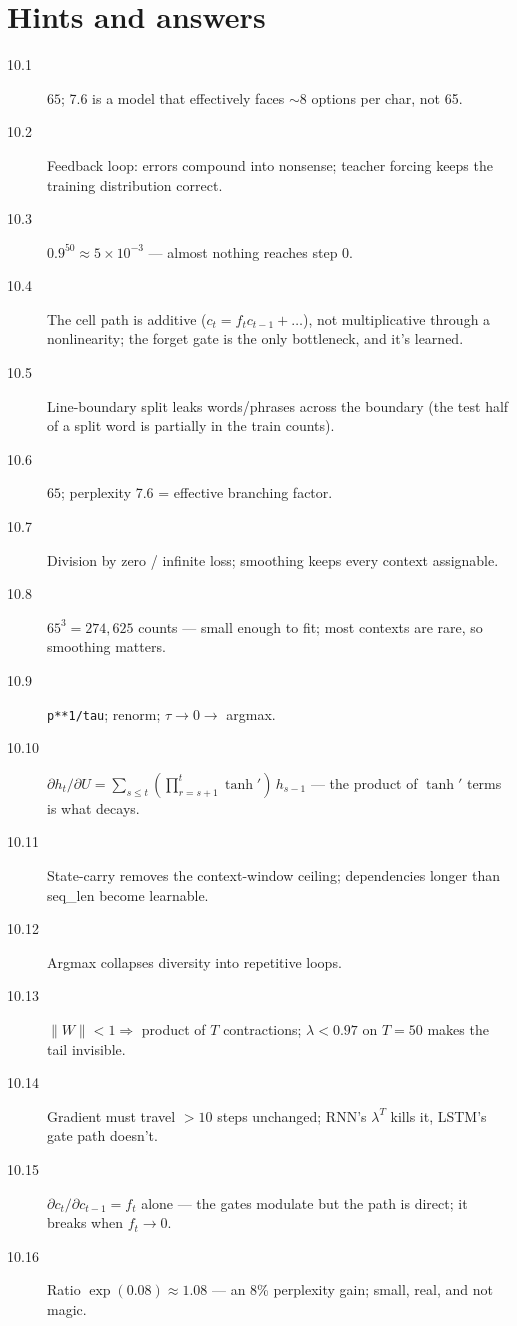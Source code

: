 \section*{Hints and answers}
\begin{description}
\item[10.1] $65$; 7.6 is a model that effectively faces $\sim$8
options per char, not 65.
\item[10.2] Feedback loop: errors compound into nonsense; teacher
forcing keeps the training distribution correct.
\item[10.3] $0.9^{50}\approx5\times10^{-3}$ --- almost nothing
reaches step 0.
\item[10.4] The cell path is additive ($c_t=f_tc_{t-1}+\ldots$), not
multiplicative through a nonlinearity; the forget gate is the only
bottleneck, and it's learned.
\item[10.5] Line-boundary split leaks words/phrases across the
boundary (the test half of a split word is partially in the train
counts).
\item[10.6] $65$; perplexity 7.6 = effective branching factor.
\item[10.7] Division by zero / infinite loss; smoothing keeps every
context assignable.
\item[10.8] $65^3=274{,}625$ counts --- small enough to fit; most
contexts are rare, so smoothing matters.
\item[10.9] \texttt{p**1/tau}; renorm; $\tau\to0\to$ argmax.
\item[10.10] $\partial h_t/\partial U=\sum_{s\le t}(\prod_{r=s+1}^{t}
\tanh')\,h_{s-1}$ --- the product of $\tanh'$ terms is what decays.
\item[10.11] State-carry removes the context-window ceiling;
dependencies longer than seq\_len become learnable.
\item[10.12] Argmax collapses diversity into repetitive loops.
\item[10.13] $\|W\|<1\Rightarrow$ product of $T$ contractions;
$\lambda<0.97$ on $T=50$ makes the tail invisible.
\item[10.14] Gradient must travel $>10$ steps unchanged; RNN's
$\lambda^T$ kills it, LSTM's gate path doesn't.
\item[10.15] $\partial c_t/\partial c_{t-1}=f_t$ alone --- the
gates modulate but the path is direct; it breaks when $f_t\to0$.
\item[10.16] Ratio $\exp(0.08)\approx1.08$ --- an 8\% perplexity
gain; small, real, and not magic.
\end{description}
